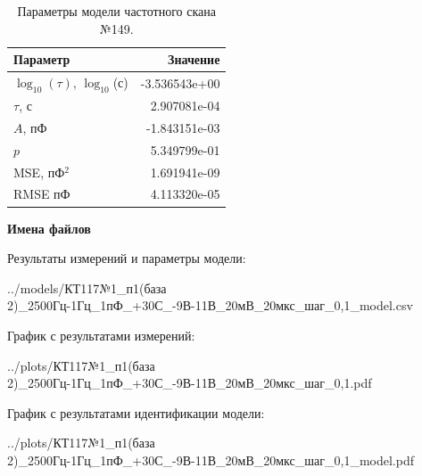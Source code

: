 \begin{table}[!ht]
    \centering
    \caption{Параметры модели частотного скана №149.}
    \begin{tabular}{|l|r|}
        \hline
        Параметр                                       & Значение                  \\ \hline
        $\log_{10}(\tau)$, $\log_{10}$(с)              & -3.536543e+00             \\ \hline
        $\tau$, с                                      & 2.907081e-04              \\ \hline
        $A$, пФ                                        & -1.843151e-03             \\ \hline
        $p$                                            & 5.349799e-01              \\ \hline
        MSE, пФ$^2$                                    & 1.691941e-09              \\ \hline
        RMSE пФ                                        & 4.113320e-05              \\ \hline
    \end{tabular}
    \label{table:frequency_scan_model_149}
\end{table}

\textbf{Имена файлов}

Результаты измерений и параметры модели:

\scriptsize../models/КТ117№1\_п1(база 2)\_2500Гц-1Гц\_1пФ\_+30С\_-9В-11В\_20мВ\_20мкс\_шаг\_0,1\_model.csv
\normalsize

График с результатами измерений:

\scriptsize../plots/КТ117№1\_п1(база 2)\_2500Гц-1Гц\_1пФ\_+30С\_-9В-11В\_20мВ\_20мкс\_шаг\_0,1.pdf
\normalsize

График с результатами идентификации модели:

\scriptsize../plots/КТ117№1\_п1(база 2)\_2500Гц-1Гц\_1пФ\_+30С\_-9В-11В\_20мВ\_20мкс\_шаг\_0,1\_model.pdf
\normalsize

